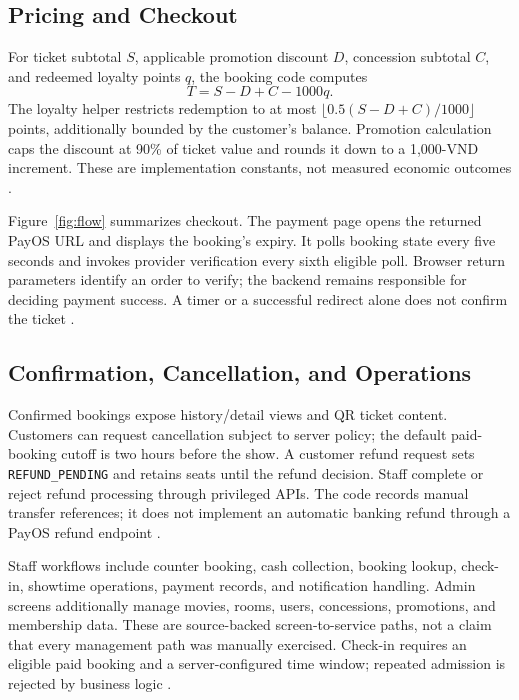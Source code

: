 \documentclass[conference]{IEEEtran}
\newcommand{\code}[1]{\texttt{#1}}
\begin{document}
\subsection{Pricing and Checkout}
For ticket subtotal $S$, applicable promotion discount $D$, concession subtotal
$C$, and redeemed loyalty points $q$, the booking code computes
\begin{equation}
T = S-D+C-1000q .\label{eq:price}
\end{equation}
The loyalty helper restricts redemption to at most
$\lfloor 0.5(S-D+C)/1000\rfloor$ points, additionally bounded by the customer's
balance. Promotion calculation caps the discount at 90\% of ticket value and
rounds it down to a 1,000-VND increment. These are implementation constants,
not measured economic outcomes \cite{booking}.

Figure~\ref{fig:flow} summarizes checkout. The payment page opens the returned
PayOS URL and displays the booking's expiry. It polls booking state every five
seconds and invokes provider verification every sixth eligible poll. Browser
return parameters identify an order to verify; the backend remains responsible
for deciding payment success. A timer or a successful redirect alone does not
confirm the ticket \cite{client,booking}.


\subsection{Confirmation, Cancellation, and Operations}
Confirmed bookings expose history/detail views and QR ticket content. Customers
can request cancellation subject to server policy; the default paid-booking
cutoff is two hours before the show. A customer refund request sets
\code{REFUND\_PENDING} and retains seats until the refund decision. Staff
complete or reject refund processing through privileged APIs. The code records
manual transfer references; it does not implement an automatic banking refund
through a PayOS refund endpoint \cite{booking,webui}.

Staff workflows include counter booking, cash collection, booking lookup,
check-in, showtime operations, payment records, and notification handling.
Admin screens additionally manage movies, rooms, users, concessions,
promotions, and membership data. These are source-backed screen-to-service
paths, not a claim that every management path was manually exercised. Check-in
requires an eligible paid booking and a server-configured time window;
repeated admission is rejected by business logic \cite{booking,webui}.
\end{document}
